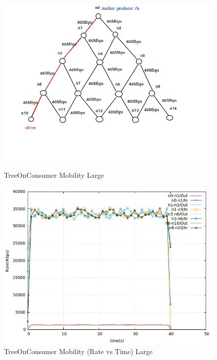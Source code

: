 \begin{figure}[H]

\begin{center}

\includegraphics[scale = 0.5]{Figures/Mob1.png}

\caption{TreeOnConsumer Mobility Large} \label{Mob1} 


\includegraphics[scale = 0.4]{Figures/mob1.png}

\caption{TreeOnConsumer Mobility (Rate vs Time) Large} \label{mob1} 


\end{center}

\end{figure}


